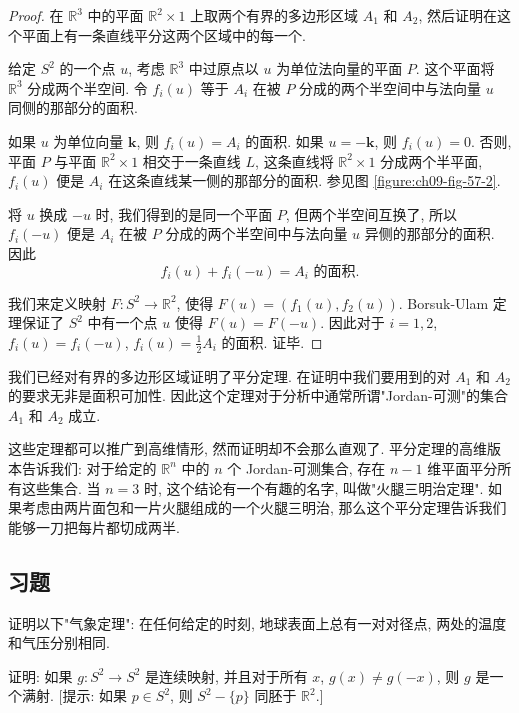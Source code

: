 \begin{proof}
在 $\mathbb{R}^{3}$ 中的平面 $\mathbb{R}^{2}\times 1$ 上取两个有界的多边形区域 $A_1$ 和 $A_2$, 然后证明在这个平面上有一条直线平分这两个区域中的每一个.

给定 $S^{2}$ 的一个点 $u$, 考虑 $\mathbb{R}^{3}$ 中过原点以 $u$ 为单位法向量的平面 $P$. 这个平面将 $\mathbb{R}^{3}$ 分成两个半空间. 令 $f_i(u)$ 等于 $A_i$ 在被 $P$ 分成的两个半空间中与法向量 $u$ 同侧的那部分的面积.

如果 $u$ 为单位向量 $\boldsymbol{k}$, 则 $f_i(u)=A_i$ 的面积. 如果 $u=-\boldsymbol{k}$, 则 $f_i(u)=0$. 否则, 平面 $P$ 与平面 $\mathbb{R}^{2}\times 1$ 相交于一条直线 $L$, 这条直线将 $\mathbb{R}^{2}\times 1$ 分成两个半平面, $f_i(u)$ 便是 $A_i$ 在这条直线某一侧的那部分的面积. 参见图 \cref{figure:ch09-fig-57-2}.

将 $u$ 换成 $-u$ 时, 我们得到的是同一个平面 $P$, 但两个半空间互换了, 所以 $f_i(-u)$ 便是 $A_i$ 在被 $P$ 分成的两个半空间中与法向量 $u$ 异侧的那部分的面积. 因此
\[
f_{i}(u)+f_{i}(-u)=A_{i}\text{ 的面积}.
\]

我们来定义映射 $F\colon S^{2}\to\mathbb{R}^{2}$, 使得 $F(u)=(f_1(u),f_2(u))$. Borsuk-Ulam 定理保证了 $S^{2}$ 中有一个点 $u$ 使得 $F(u)=F(-u)$. 因此对于 $i=1,2$, $f_i(u)=f_i(-u)$, $f_i(u)=\frac{1}{2}A_i$ 的面积. 证毕.
\end{proof}


我们已经对有界的多边形区域证明了平分定理. 在证明中我们要用到的对 $A_1$ 和 $A_2$ 的要求无非是面积可加性. 因此这个定理对于分析中通常所谓"Jordan-可测"的集合 $A_1$ 和 $A_2$ 成立.

这些定理都可以推广到高维情形, 然而证明却不会那么直观了. 平分定理的高维版本告诉我们: 对于给定的 $\mathbb{R}^{n}$ 中的 $n$ 个 Jordan-可测集合, 存在 $n-1$ 维平面平分所有这些集合. 当 $n=3$ 时, 这个结论有一个有趣的名字, 叫做"火腿三明治定理". 如果考虑由两片面包和一片火腿组成的一个火腿三明治, 那么这个平分定理告诉我们能够一刀把每片都切成两半.

\subsection*{习题}

\begin{exercise}
证明以下"气象定理": 在任何给定的时刻, 地球表面上总有一对对径点, 两处的温度和气压分别相同.
\end{exercise}

\begin{exercise}
证明: 如果 $g\colon S^{2}\to S^{2}$ 是连续映射, 并且对于所有 $x$, $g(x)\neq g(-x)$, 则 $g$ 是一个满射. [提示: 如果 $p\in S^{2}$, 则 $S^{2}-\{p\}$ 同胚于 $\mathbb{R}^{2}$.]
\end{exercise}

